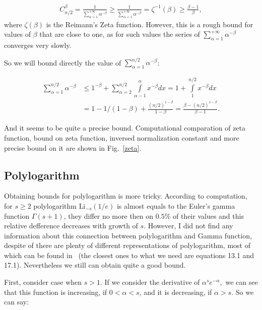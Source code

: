 \documentclass{article}
\begin{document}
\begin{align*}
  C_{n/2}^\beta = \frac{1}{\sum\limits_{\alpha = 1}^{+\infty} \alpha^{-\beta}} \ge \frac{1}{\sum\limits_{\alpha = 1}^{+\infty} \alpha^{-\beta}} = \zeta^{-1}(\beta) \ge \frac{\beta - 1}{\beta},
\end{align*}
where $\zeta(\beta)$ is the Reimann's Zeta function. However, this is a rough bound for values of $\beta$ that are close to one, as for such values the series of $\sum\limits_{\alpha = 1}^{+\infty} \alpha^{-\beta}$ converges very slowly.

So we will bound directly the value of $\sum\limits_{\alpha = 1}^{n/2} \alpha^{-\beta}$:

\begin{align*}
  \sum\limits_{\alpha = 1}^{n/2} \alpha^{-\beta} &\le 1^{-\beta} + \sum\limits_{\alpha = 2}^{n/2}\int\limits_{\alpha - 1}^{\alpha} x^{-\beta} dx = 1 + \int\limits_1^{n/2} x^{-\beta} dx \\
  &= 1 - 1/(1 - \beta) + \frac{(n/2)^{1 -\beta}}{1 - \beta}= \frac{\beta- (n/2)^{1 -\beta}}{\beta - 1}.
\end{align*}

And it seems to be quite a precise bound. Computational comparation of zeta function, bound on zeta function, inversed normalization constant and more precise bound on it are shown in Fig.~\ref{zeta}.



\subsection{Polylogarithm}

Obtaining bounds for polylogarithm is more tricky. According to computation, for $s \ge 2$ polylogarithm $\text{Li}_{-s}(1/e)$ is almost equals to the Euler's gamma function $\Gamma(s + 1)$, they differ no more then on $0.5\%$ of their values and this relative defference decreases with growth of $s$. However, I did not find any information about this connection between polylogarithm and Gamma function, despite of there are plenty of different representations of polylogarithm, most of which can be found in~\cite{polylog} (the closest ones to what we need are equations 13.1 and 17.1). Nevertheless we still can obtain quite a good bound.

First, consider case when $s > 1$. If we consider the derivative of $\alpha^s e^{-\alpha},$ we can see that this function is increasing, if $0 < \alpha < s$, and it is decreasing, if $\alpha > s$. So we can say:
\end{document}
